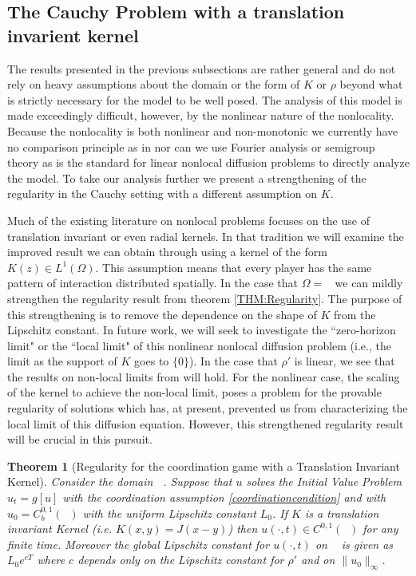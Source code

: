 \documentclass[aps,
preprint,
groupedaddress,
showkeys,
amsmath]{revtex4-2}
\newtheorem{theorem}{Theorem}
\DeclareMathOperator{\Rn}{\mathbb{R}^n}
\begin{document}
    \subsection{The Cauchy Problem with a translation invarient kernel}\label{SUBSEC:AdditionalResults}
    The results presented in the previous subsections are rather general and do not rely on heavy assumptions about the domain or the form of $K$ or $\rho$ beyond what is strictly necessary for the model to be well posed. The analysis of this model is made exceedingly difficult, however, by the nonlinear nature of the nonlocality. Because the nonlocality is both nonlinear and non-monotonic we currently have no comparison principle as in \cite{Santos2022} nor can we use Fourier analysis or semigroup theory as is the standard for linear nonlocal diffusion problems \cite{NonlocalDiffuisionandApplications,NonlocalDiffusionProblems,Kavallaris2018} to directly analyze the model. To take our analysis further we present a strengthening of the regularity in the Cauchy setting with a different assumption on $K$.
  
    Much of the existing literature on nonlocal problems focuses on the use of translation invariant or even radial kernels. In that tradition we will examine the improved result we can obtain through using a kernel of the form $K(z)\in L^{1}(\Omega)$. This assumption means that every player has the same pattern of interaction distributed spatially. In the case that $\Omega=\Rn$ we can mildly strengthen the regularity result from theorem \ref{THM:Regularity}. The purpose of this strengthening is to remove the dependence on the shape of $K$ from the Lipschitz constant. In future work, we will seek to investigate the ``zero-horizon limit" or the ``local limit" of this nonlinear nonlocal diffusion problem (i.e., the limit as the support of $K$ goes to $\{0\}$). In the case that $\rho'$ is linear, we see that the results on non-local limits from \cite{DU2015,Du2022,Mengesha2015,NonlocalDiffusionProblems,Tao2017,Tao2019} will hold. For the nonlinear case, the scaling of the kernel to achieve the non-local limit, poses a problem for the provable regularity of solutions which has, at present, prevented us from characterizing the local limit of this diffusion equation. However,  this strengthened regularity result will be crucial in this pursuit.  

    \begin{theorem}[Regularity for the coordination game with a Translation Invariant Kernel]\label{THM:CauchyRegularity}
    Consider the domain $\Rn$. Suppose that $u$ solves the Initial Value Problem $u_t=g[u]$ with the coordination assumption \eqref{coordinationcondition} and with $u_0=C_b^{0,1}(\Rn)$ with the uniform Lipschitz constant $L_0$. If $K$ is a translation invariant Kernel (i.e. $K(x,y)=J(x-y)$) then $u(\cdot, t)\in C^{0,1}(\Rn)$ for any finite time. Moreover the global Lipschitz constant for $u(\cdot, t)$ on $ \Rn$ is given as $L_0e^{cT}$ where $c$ depends only on the Lipschitz constant for $\rho'$ and on $\|u_0\|_\infty$. 
    \end{theorem}
\end{document}
